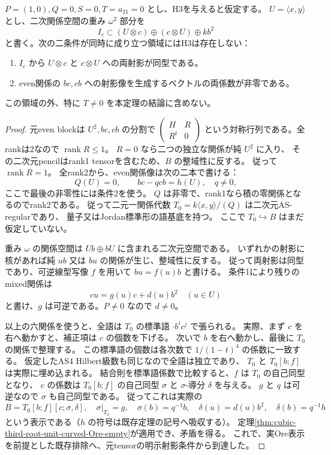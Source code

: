 \begin{theorem}
\label{thm:cubic-third-root-unit-onezero-projection}
$P=(1,0),Q=0,S=0,T=a_{21}=0$ とし、H3を与えると仮定する。
$U=\langle x,y\rangle$ とし、二次関係空間の重み $\omega^2$ 部分を
\[
 I_c\subset (U\otimes c)\oplus(c\otimes U)\oplus k b^2
\]
と書く。次の二条件が同時に成り立つ領域にはH3は存在しない：
\begin{enumerate}
\item $I_c$ から $U\otimes c$ と $c\otimes U$ への両射影が同型である。
\item even関係の $bc,cb$ への射影像を生成するベクトルの両係数が非零である。
\end{enumerate}
この領域の外、特に $T\ne0$ を本定理の結論に含めない。
\end{theorem}
\begin{proof}
元even blockは $U^2,bc,cb$ の分割で
$\left(\begin{smallmatrix}H&R\\R^t&0\end{smallmatrix}\right)$
という対称行列である。全rankは2なので $\operatorname{rank}R\le1$。
$R=0$ なら二つの独立な関係が純 $U^2$ に入り、
その二次元pencilはrank1 tensorを含むため、$B$ の整域性に反する。
従って $\operatorname{rank}R=1$。
全rank2から、even関係像は次の二本で書ける：
\[
 Q(U)=0,\qquad bc-qcb=h(U),\quad q\ne0,
\]
ここで最後の非零性には条件2を使う。
$Q$ は非零で、rank1なら積の零関係となるのでrank2である。
従って二元一関係代数 $T_0=k\langle x,y\rangle/(Q)$ は二次元AS-regularであり、
量子又はJordan標準形の語基底を持つ。
ここで $T_0\hookrightarrow B$ はまだ仮定していない。

重み $\omega$ の関係空間は $Ub\oplus bU$ に含まれる二次元空間である。
いずれかの射影に核があれば純 $ub$ 又は $bu$ の関係が生じ、整域性に反する。
従って両射影は同型であり、可逆線型写像 $f$ を用いて
$b u=f(u)b$ と書ける。
条件1により残りのmixed関係は
\[
 c u=g(u)c+d(u)b^2\quad(u\in U)
\]
と書け、$g$ は可逆である。$P\ne0$ なので $d\ne0$。

以上の六関係を使うと、全語は
$T_0$ の標準語 $\cdot b^i c^j$ で張られる。
実際、まず $c$ を右へ動かすと、補正項は $c$ の個数を下げる。
次いで $b$ を右へ動かし、最後に $T_0$ の関係で整理する。
この標準語の個数は各次数で $1/(1-t)^4$ の係数に一致する。
仮定したAS4 Hilbert級数も同じなので全語は独立であり、
$T_0$ と $T_0[b;f]$ は実際に埋め込まれる。
結合則を標準語係数で比較すると、$f$ は $T_0$ の自己同型となり、
$c$ の係数は $T_0[b;f]$ の自己同型 $\sigma$ と $\sigma$-導分 $\delta$ を与える。
$g$ と $q$ は可逆なので $\sigma$ も自己同型である。
従ってこれは実際の
\[
 B=T_0[b;f][c;\sigma,\delta],\quad
 \sigma|_{T_0}=g,\quad\sigma(b)=q^{-1}b,\quad
 \delta(u)=d(u)b^2,\quad\delta(b)=q^{-1}h
\]
という表示である（$h$ の符号は既存定理の記号へ吸収する）。
定理\ref{thm:cubic-third-root-unit-curved-Ore-empty}が適用でき、矛盾を得る。
これで、実Ore表示を前提とした既存排除へ、元tensorの明示射影条件から到達した。
\end{proof}

